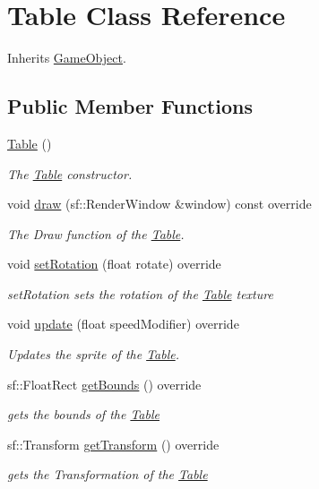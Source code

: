 \hypertarget{class_table}{\section{Table Class Reference}
\label{class_table}
}


Inherits \hyperlink{class_game_object}{Game\+Object}.

\subsection*{Public Member Functions}
\begin{DoxyCompactItemize}
\item 
\hyperlink{class_table_a049f2e06391781ae255c6698869c4ad1}{Table} ()
\begin{DoxyCompactList}\small\item\em The \hyperlink{class_table}{Table} constructor. \end{DoxyCompactList}\item 
void \hyperlink{class_table_af11162bb18173237925aef067ab07e87}{draw} (sf\+::\+Render\+Window \&window) const override
\begin{DoxyCompactList}\small\item\em The Draw function of the \hyperlink{class_table}{Table}. \end{DoxyCompactList}\item 
void \hyperlink{class_table_ae331c0377b28ee3c21b3d70b969841e2}{set\+Rotation} (float rotate) override
\begin{DoxyCompactList}\small\item\em set\+Rotation sets the rotation of the \hyperlink{class_table}{Table} texture \end{DoxyCompactList}\item 
void \hyperlink{class_table_af37e903447fa51718b7ad49dd2d4dbc3}{update} (float speed\+Modifier) override
\begin{DoxyCompactList}\small\item\em Updates the sprite of the \hyperlink{class_table}{Table}. \end{DoxyCompactList}\item 
sf\+::\+Float\+Rect \hyperlink{class_table_a4b3e8a7218a1095cf3ab7da58fb7f977}{get\+Bounds} () override
\begin{DoxyCompactList}\small\item\em gets the bounds of the \hyperlink{class_table}{Table} \end{DoxyCompactList}\item 
sf\+::\+Transform \hyperlink{class_table_afdc573e44d9de924c991eaa36efb6c56}{get\+Transform} () override
\begin{DoxyCompactList}\small\item\em gets the Transformation of the \hyperlink{class_table}{Table} \end{DoxyCompactList}\end{DoxyCompactItemize}
